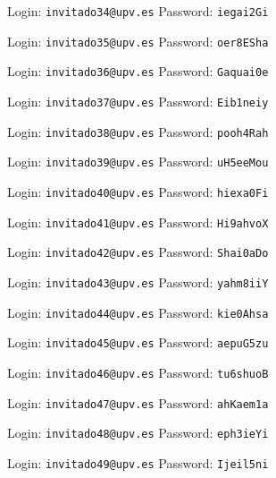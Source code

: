 \documentclass[12pt]{article}
\begin{document}
Login: \texttt{invitado34@upv.es} Password: \texttt{iegai2Gi}
\vspace{2cm}

Login: \texttt{invitado35@upv.es} Password: \texttt{oer8ESha}
\vspace{2cm}

Login: \texttt{invitado36@upv.es} Password: \texttt{Gaquai0e}
\vspace{2cm}

Login: \texttt{invitado37@upv.es} Password: \texttt{Eib1neiy}
\vspace{2cm}

Login: \texttt{invitado38@upv.es} Password: \texttt{pooh4Rah}
\vspace{2cm}

Login: \texttt{invitado39@upv.es} Password: \texttt{uH5eeMou}
\vspace{2cm}

Login: \texttt{invitado40@upv.es} Password: \texttt{hiexa0Fi}
\vspace{2cm}

Login: \texttt{invitado41@upv.es} Password: \texttt{Hi9ahvoX}
\vspace{2cm}

Login: \texttt{invitado42@upv.es} Password: \texttt{Shai0aDo}
\vspace{2cm}

Login: \texttt{invitado43@upv.es} Password: \texttt{yahm8iiY}
\vspace{2cm}

Login: \texttt{invitado44@upv.es} Password: \texttt{kie0Ahsa}
\vspace{2cm}

Login: \texttt{invitado45@upv.es} Password: \texttt{aepuG5zu}
\vspace{2cm}

Login: \texttt{invitado46@upv.es} Password: \texttt{tu6shuoB}
\vspace{2cm}

Login: \texttt{invitado47@upv.es} Password: \texttt{ahKaem1a}
\vspace{2cm}

Login: \texttt{invitado48@upv.es} Password: \texttt{eph3ieYi}
\vspace{2cm}

Login: \texttt{invitado49@upv.es} Password: \texttt{Ijeil5ni}
\end{document}
